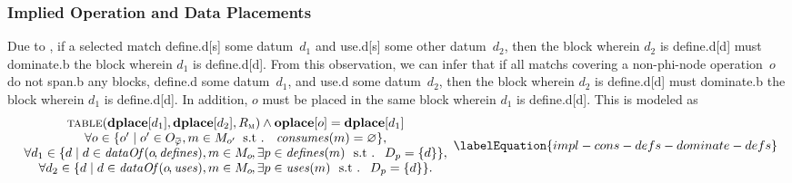 \subsubsection{Implied Operation and Data Placements}

Due to , if a selected \gls{match}
\gls{define.d}[s] some \gls{datum}~$d_1$ and \gls{use.d}[s] some other
\gls{datum}~$d_2$, then the \gls{block} wherein $d_2$ is \gls{define.d}[d] must
\gls{dominate.b} the \gls{block} wherein $d_1$ is \gls{define.d}[d].
%
From this observation, we can infer that if all \glspl{match} covering a
non-\gls{phi-node} \gls{operation}~$o$ do not \gls{span.b} any \glspl{block},
\gls{define.d} some \gls{datum}~$d_1$, and \gls{use.d} some \gls{datum}~$d_2$,
then the \gls{block} wherein $d_2$ is \gls{define.d}[d] must \gls{dominate.b}
the \gls{block} wherein $d_1$ is \gls{define.d}[d].
%
In addition, $o$ must be placed in the same \gls{block} wherein $d_1$ is
\gls{define.d}[d].
%
This is modeled as
%
\begin{equation}
  \begin{array}{c}
    \mTable(\mVar{dplace}[d_1], \mVar{dplace}[d_2], \mDomMatrix)
    \mAnd
    \mVar{oplace}[o] = \mVar{dplace}[d_1] \\
    \forall o \in
      \mSetBuilder{o'}%
                  {%
                    o' \in \mOpCompSet{\mPhi},
                    m \in \mMatchSet[o'] \hspace{-1pt}
                    \text{ \st }
                    \mConsumes(m) = \mEmptySet
                  }, \\
    \forall d_1 \in
      \mSetBuilder{d}%
                  {%
                    d \in \mDataOf(o \hspace{-1pt}, \mDefines),
                    m \in \mMatchSet[o] \hspace{-1pt},
                    \exists p \in \mDefines(m)
                    \text{ \st }
                    \mDataSet[p] = \mSet{d}
                  }, \\
    \forall d_2 \in
      \mSetBuilder{d}%
                  {%
                    d \in \mDataOf(o \hspace{-1pt}, \mUses),
                    m \in \mMatchSet[o] \hspace{-1pt},
                    \exists p \in \mUses(m)
                    \text{ \st }
                    \mDataSet[p] = \mSet{d}
                  }.
  \end{array}
  \labelEquation{impl-cons-defs-dominate-defs}
\end{equation}

